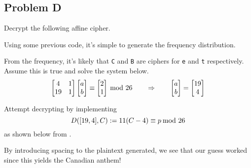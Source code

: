 \documentclass[../hw_sols.tex]{subfiles}
\begin{document}
\newpage



\subsection*{Problem D}

Decrypt the following affine cipher.

\begin{solution}

Using some previous code, it's simple to generate the frequency distribution.


From the frequency, it's likely that \verb|C| and \verb|B| are ciphers for 
\verb|e| and \verb|t| respectively. Assume this is true and solve the system 
below.
	\[ \begin{bmatrix} 4 & 1 \\ 19 & 1 \end{bmatrix}
	\begin{bmatrix} a \\ b \end{bmatrix}
	\equiv
	\begin{bmatrix} 2 \\ 1 \end{bmatrix} \tmod{26} 
	\qquad \Rightarrow \qquad
	\begin{bmatrix} a \\ b \end{bmatrix}
	= 
	\begin{bmatrix} 19 \\ 4 \end{bmatrix} \]

Attempt decrypting by implementing 
	\[ D([19,4],C) := 11(C-4) \equiv p \tmod{26} \]
as shown below from .



By introducing spacing to the plaintext generated, we see that our guess 
worked since this yields the Canadian anthem!

\end{solution}
\end{document}
